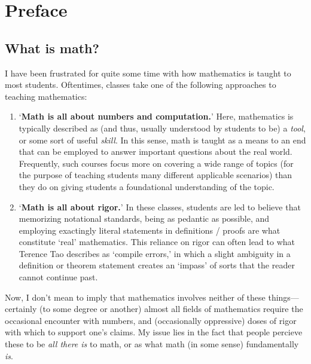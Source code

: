 \documentclass[10pt]{article}
\theoremstyle{definition}
\begin{document}
\pagestyle{fancy}

\setlength{\headheight}{0pt}
\setlength\parindent{0pt}



\setlength{\headheight}{0pt}
\tableofcontents
\newpage
\section{Preface}
\subsection{What is math?}
I have been frustrated for quite some time with how mathematics is taught to most students.  Oftentimes, classes take one of the following approaches to teaching mathematics:
\begin{enumerate}
    \item `\textbf{Math is all about numbers and computation.}'  Here, mathematics is typically described as (and thus, usually understood by students to be) a \emph{tool}, or some sort of useful \emph{skill}.  In this sense, math is taught as a means to an end that can be employed to answer important questions about the real world.  Frequently, such courses focus more on covering a wide range of topics (for the purpose of teaching students many different applicable scenarios) than they do on giving students a foundational understanding of the topic.  
    \item `\textbf{Math is all about rigor.}'  In these classes, students are led to believe that memorizing notational standards, being as pedantic as possible, and employing exactingly literal statements in definitions / proofs are what constitute `real' mathematics.  This reliance on rigor can often lead to what Terence Tao describes as `compile errors,' in which a slight ambiguity in a definition or theorem statement creates an `impass' of sorts that the reader cannot continue past.
\end{enumerate}
Now, I don't mean to imply that mathematics involves neither of these things---certainly (to some degree or another) almost all fields of  mathematics require the occasional encounter with numbers, and (occasionally oppressive) doses of rigor with which to support one's claims.  My issue lies in the fact that people percieve these to be \emph{all there is} to math, or as what math (in some sense) fundamentally \emph{is}.\\~\\
\end{document}
